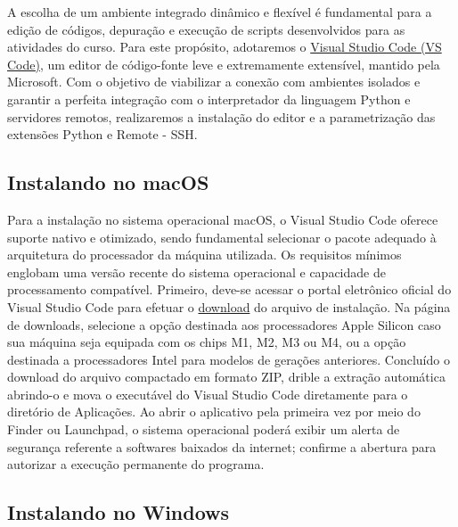 A escolha de um ambiente integrado dinâmico e flexível é fundamental para a edição de códigos, depuração e execução de scripts desenvolvidos para as atividades do curso. Para este propósito, adotaremos o \href{https://code.visualstudio.com}{Visual Studio Code (VS Code)}, um editor de código-fonte leve e extremamente extensível, mantido pela Microsoft.
Com o objetivo de viabilizar a conexão com ambientes isolados e garantir a perfeita integração com o interpretador da linguagem Python e servidores remotos, realizaremos a instalação do editor e a parametrização das extensões Python e Remote - SSH.

\subsection*{Instalando no macOS}

Para a instalação no sistema operacional macOS, o Visual Studio Code oferece suporte nativo e otimizado, sendo fundamental selecionar o pacote adequado à arquitetura do processador da máquina utilizada. Os requisitos mínimos englobam uma versão recente do sistema operacional e capacidade de processamento compatível.
Primeiro, deve-se acessar o portal eletrônico oficial do Visual Studio Code para efetuar o \href{https://code.visualstudio.com/download?_exp_download=fb315fc982}{download} do arquivo de instalação. Na página de downloads, selecione a opção destinada aos processadores Apple Silicon caso sua máquina seja equipada com os chips M1, M2, M3 ou M4, ou a opção destinada a processadores Intel para modelos de gerações anteriores. Concluído o download do arquivo compactado em formato ZIP, drible a extração automática abrindo-o e mova o executável do Visual Studio Code diretamente para o diretório de Aplicações. Ao abrir o aplicativo pela primeira vez por meio do Finder ou Launchpad, o sistema operacional poderá exibir um alerta de segurança referente a softwares baixados da internet; confirme a abertura para autorizar a execução permanente do programa.

\subsection*{Instalando no Windows}


